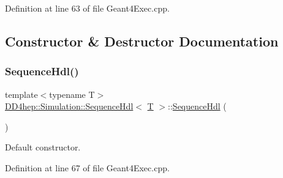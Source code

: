 Definition at line 63 of file Geant4\+Exec.\+cpp.



\subsection{Constructor \& Destructor Documentation}
\hypertarget{class_d_d4hep_1_1_simulation_1_1_sequence_hdl_aeb88368d61e8f34a82e6acc1c8794521}{}\label{class_d_d4hep_1_1_simulation_1_1_sequence_hdl_aeb88368d61e8f34a82e6acc1c8794521} 
\subsubsection{\texorpdfstring{Sequence\+Hdl()}{SequenceHdl()}\hspace{0.1cm}{\footnotesize\ttfamily [1/2]}}
{\footnotesize\ttfamily template$<$typename T$>$ \\
\hyperlink{class_d_d4hep_1_1_simulation_1_1_sequence_hdl}{D\+D4hep\+::\+Simulation\+::\+Sequence\+Hdl}$<$ \hyperlink{class_t}{T} $>$\+::\hyperlink{class_d_d4hep_1_1_simulation_1_1_sequence_hdl}{Sequence\+Hdl} (\begin{DoxyParamCaption}{ }\end{DoxyParamCaption})\hspace{0.3cm}{\ttfamily [inline]}}



Default constructor. 



Definition at line 67 of file Geant4\+Exec.\+cpp.

\hypertarget{class_d_d4hep_1_1_simulation_1_1_sequence_hdl_a6a75a0ed136c559a8187ebcf6713a014}{}\label{class_d_d4hep_1_1_simulation_1_1_sequence_hdl_a6a75a0ed136c559a8187ebcf6713a014} 
